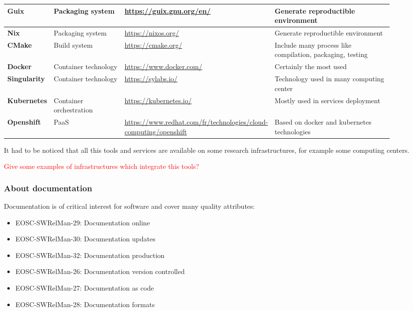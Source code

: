 \begin{center}
    \tabletail{\hline}
    \label{tab:tools_pack}
    \small
    \begin{supertabular}{|p{0.12\linewidth}|p{0.2\linewidth}|p{0.25\linewidth}|p{0.35\linewidth}|} \hline
    \textbf{Guix} & Packaging system & \url{https://guix.gnu.org/en/}
    & Generate reproductible environment \\ \hline
    \textbf{Nix} & Packaging system & \url{https://nixos.org/}
    & Generate reproductible environment \\ \hline
    \textbf{CMake} & Build system & \url{https://cmake.org/}
    & Include many process like compilation, packaging, testing  \\ \hline


    \textbf{Docker} & Container technology & \url{https://www.docker.com/}
    &  Certainly the most used \\ \hline
    \textbf{Singularity} & Container technology & \url{https://sylabs.io/}
    & Technology used in many computing center  \\ \hline
    \textbf{Kubernetes} & Container orchestration & \url{https://kubernetes.io/}
    & Mostly used in services deployment  \\ \hline
    \textbf{Openshift} & PaaS & \url{https://www.redhat.com/fr/technologies/cloud-computing/openshift}
    & Based on docker and kubernetes technologies  \\ \hline


\end{supertabular}
\end{center}

It had to be noticed that all this tools and services are available on
some research infrastructures, for example some computing centers.

\textcolor{red}{Give some examples of infrastructures which integrate
  this tools?}

\subsubsection{About documentation}

Documentation is of critical interest for software and cover many
quality attributes: 

\begin{itemize}
  \item EOSC-SWRelMan-29: Documentation online
  \item EOSC-SWRelMan-30: Documentation updates
  \item EOSC-SWRelMan-32: Documentation production
  \item EOSC-SWRelMan-26: Documentation version controlled
  \item EOSC-SWRelMan-27: Documentation as code
  \item EOSC-SWRelMan-28: Documentation formats
\end{itemize}

